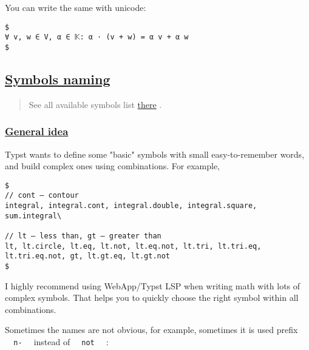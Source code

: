 \pandocbounded{}

You can write the same with unicode:

\begin{verbatim}
$
∀ v, w ∈ V, α ∈ 𝕂: α ⋅ (v + w) = α v + α w
$
\end{verbatim}

\pandocbounded{}

\subsection{\texorpdfstring{\hyperref[symbols-naming]{Symbols
naming}}{Symbols naming}}\label{symbols-naming}

\begin{quote}
See all available symbols list
\href{https://typst.app/docs/reference/symbols/sym/}{there} .
\end{quote}

\subsubsection{\texorpdfstring{\hyperref[general-idea]{General
idea}}{General idea}}\label{general-idea}

Typst wants to define some "basic" symbols with small easy-to-remember
words, and build complex ones using combinations. For example,

\begin{verbatim}
$
// cont — contour
integral, integral.cont, integral.double, integral.square, sum.integral\

// lt — less than, gt — greater than
lt, lt.circle, lt.eq, lt.not, lt.eq.not, lt.tri, lt.tri.eq, lt.tri.eq.not, gt, lt.gt.eq, lt.gt.not
$
\end{verbatim}

\pandocbounded{}

I highly recommend using WebApp/Typst LSP when writing math with lots of
complex symbols. That helps you to quickly choose the right symbol
within all combinations.

Sometimes the names are not obvious, for example, sometimes it is used
prefix \texttt{\ }{\texttt{\ n-\ }}\texttt{\ } instead of
\texttt{\ }{\texttt{\ not\ }}\texttt{\ } :

